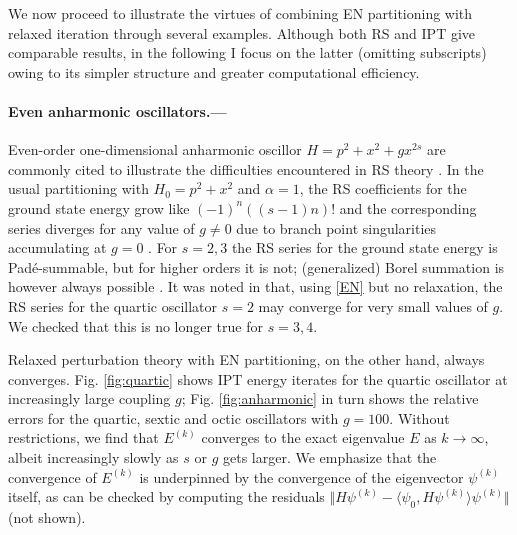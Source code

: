\documentclass[aps,prl,reprint]{revtex4-2}
\begin{document}
    We now proceed to illustrate the virtues of combining EN partitioning with relaxed iteration through several examples. Although both RS and IPT give comparable results, in the following I focus on the latter (omitting subscripts) owing to its simpler structure and greater computational efficiency.


    \paragraph{Even anharmonic oscillators.---} Even-order one-dimensional anharmonic oscillor $H = p^2 + x^2 + g x^{2s}$ are commonly cited to illustrate the difficulties encountered in RS theory \cite{simon1982large, Calicetiusefulalgorithmsslowly2007}. In the usual partitioning with $H_0  = p^2 + x^2$ and $\alpha = 1$, the RS coefficients for the ground state energy grow like $(-1)^n((s-1)n)!$ and the corresponding series diverges for any value of $g \neq 0$ due to branch point singularities accumulating at $g=0$ \cite{benderAnharmonicOscillator1969, SimonCouplingconstantanalyticity1970}. For $s = 2, 3$ the RS series for the ground state energy is Padé-summable, but for higher orders it is not; (generalized) Borel summation is however always possible \cite{Calicetiusefulalgorithmsslowly2007}.  It was noted in \cite{surjanConvergenceEnhancementPerturbation2004} that, using \eqref{EN} but no relaxation, the RS series for the quartic oscillator $s=2$ may converge for very small values of $g$. We checked that this is no longer true for $s=3, 4$.

	Relaxed perturbation theory with EN partitioning, on the other hand, always converges. Fig. \ref{fig:quartic} shows IPT energy iterates for the quartic oscillator at increasingly large coupling $g$; Fig. \ref{fig:anharmonic} in turn shows the relative errors for the quartic, sextic and octic oscillators with $g=100$. Without restrictions, we find that $E^{(k)}$ converges to the exact eigenvalue $E$ as $k\to\infty$, albeit increasingly slowly as $s$ or $g$ gets larger. We emphasize that the convergence of $E^{(k)}$ is underpinned by the convergence of the eigenvector $\psi^{(k)}$ itself, as can be checked by computing the residuals $\Vert H\psi^{(k)} -\langle \psi_0,H\psi^{(k)}\rangle \psi^{(k)}\Vert$ (not shown). %
\end{document}
